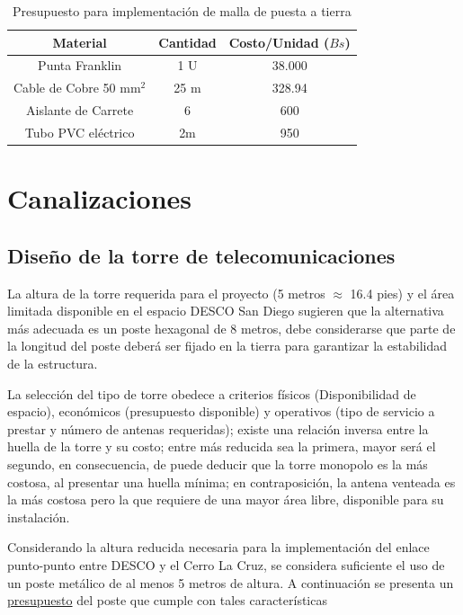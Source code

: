 \documentclass[11pt, a4paper, twosides]{report}
\begin{document}
\begin{table}[h]
    \centering
    \begin{tabular}{|c|c|c|}
        \hline
        \cellcolor{gray75} \textbf{Material} & \cellcolor{gray75} \textbf{Cantidad} & \cellcolor{gray75} \textbf{Costo/Unidad ($ Bs $)} \\ \hline
        Punta Franklin & 1 U & 38.000 \\ \hline
        Cable de Cobre 50 mm$^{2}$  & 25 m & 328.94 \\ \hline
        Aislante de Carrete & 6 & 600 \\ \hline
        Tubo PVC eléctrico & 2m & 950 \\ \hline
    \end{tabular}
    \caption{Presupuesto para implementación de malla de puesta a tierra}
\end{table}

\chapter{Canalizaciones}
\section{Diseño de la torre de telecomunicaciones}
La altura de la torre requerida para el proyecto (5 metros $\approx$ 16.4 pies) y el área limitada disponible en el espacio DESCO San Diego sugieren que la alternativa más adecuada es un poste hexagonal de 8 metros, debe considerarse que parte de la longitud del poste deberá ser fijado en la tierra para garantizar la estabilidad de la estructura.

La selección del tipo de torre obedece a criterios físicos (Disponibilidad de espacio), económicos (presupuesto disponible) y operativos (tipo de servicio a prestar y número de antenas requeridas)\cite{freeman2006radio}; existe una relación inversa entre la huella de la torre y su costo; entre más reducida sea la primera, mayor será el segundo, en consecuencia, de puede deducir que la torre monopolo es la más costosa, al presentar una huella mínima; en contraposición, la antena venteada es la más costosa pero la que  requiere de una mayor área libre, disponible para su instalación. 

Considerando la altura reducida necesaria para la implementación del enlace punto-punto entre DESCO y el Cerro La Cruz, se considera suficiente el uso de un poste metálico de al menos 5 metros de altura. A continuación se presenta un \href{http://articulo.mercadolibre.com.ve/MLV-462232615-postes-hexagonal-600-m-_JM}{presupuesto} del poste que cumple con tales características 
\end{document}
